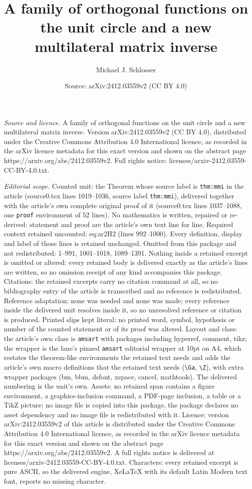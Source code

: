 \documentclass[10pt,a4paper]{amsart}
\title[A family of orthogonal functions on the unit circle and a ne]{A family of orthogonal functions on the unit circle and a new multilateral matrix inverse}
\author{Michael J. Schlosser}
\date{Source: arXiv:2412.03559v2 (CC BY 4.0)}
\begin{document}
\maketitle

\noindent\emph{Source and licence.} A family of orthogonal functions on the unit circle and a new multilateral matrix inverse. Version arXiv:2412.03559v2 (CC BY 4.0), distributed under the Creative Commons Attribution 4.0 International licence, as recorded in the arXiv licence metadata for this exact version and shown on the abstract page https://arxiv.org/abs/2412.03559v2. Full rights notice: licenses/arxiv-2412.03559-CC-BY-4.0.txt.\par\smallskip

\noindent\textit{Editorial scope.} Counted unit: the Theorem whose source label is \texttt{thm:mmi} in the article (source0.tex lines 1019--1036, source label \texttt{thm:mmi}), delivered together with the article's own complete original proof of it (source0.tex lines 1037--1088, one \texttt{proof} environment of 52 lines). No mathematics is written, repaired or re-derived: statement and proof are the article's own text line for line. Required context retained uncounted: eq:ar2H2 (lines 992--1000). Every definition, display and label of those lines is retained unchanged. Omitted from this package and not redistributed: 1--991, 1001--1018, 1089--1391. Nothing inside a retained excerpt is omitted or altered: every retained body is delivered exactly as the article's lines are written, so no omission receipt of any kind accompanies this package. Citations: the retained excerpts carry no citation command at all, so no bibliography entry of the article is transcribed and no reference is redistributed. Reference adaptation: none was needed and none was made; every reference inside the delivered unit resolves inside it, so no unresolved reference or citation is produced. Printed slips kept literal: no printed word, symbol, hypothesis or number of the counted statement or of its proof was altered. Layout and class: the article's own class is \texttt{amsart} with packages including hyperref, comment, tikz; the wrapper is the lane's pinned \texttt{amsart} editorial wrapper at 10pt on A4, which restates the theorem-like environments the retained text needs and adds the article's own macro definitions that the retained text needs (\texttt{\textbackslash Ga}, \texttt{\textbackslash Z}), with extra wrapper packages (bm, bbm, dsfont, xspace, cancel, mathtools). The delivered numbering is the unit's own. Assets: no retained span contains a figure environment, a graphics-inclusion command, a PDF-page inclusion, a table or a TikZ picture; no image file is copied into this package, the package declares no asset dependency and no image file is redistributed with it. Licence: version arXiv:2412.03559v2 of this article is distributed under the Creative Commons Attribution 4.0 International licence, as recorded in the arXiv licence metadata for this exact version and shown on the abstract page https://arxiv.org/abs/2412.03559v2. A full rights notice is delivered at licenses/arxiv-2412.03559-CC-BY-4.0.txt. Characters: every retained excerpt is pure ASCII, so the delivered engine, XeLaTeX with its default Latin Modern text font, reports no missing character.
\end{document}
